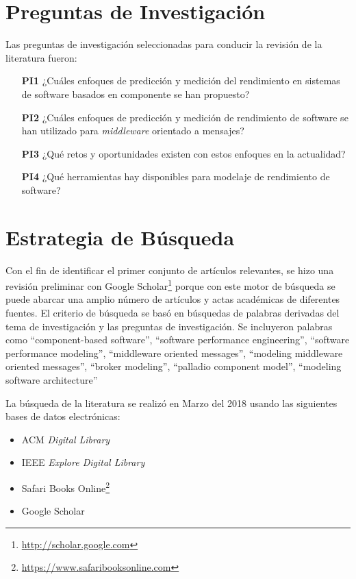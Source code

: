\documentclass[11pt, twoside]{report}
\begin{document}
\section{Preguntas de Investigación}
Las preguntas de investigación seleccionadas para conducir la revisión de la literatura fueron:
\begin{enumerate}
    \item[\textbf{PI1}] ¿Cuáles enfoques de predicción y medición del rendimiento en sistemas de software basados en componente se han propuesto?
    \item[\textbf{PI2}] ¿Cuáles enfoques de predicción y medición de rendimiento de software se han utilizado para \emph{middleware} orientado a mensajes?    
    \item[\textbf{PI3}] ¿Qué retos y oportunidades existen con estos enfoques en la actualidad?
    \item[\textbf{PI4}] ¿Qué herramientas hay disponibles para modelaje de rendimiento de software?
\end{enumerate}

\section{Estrategia de Búsqueda}
Con el fin de identificar el primer conjunto de artículos relevantes, se hizo una revisión preliminar con Google Scholar\footnote{\url{http://scholar.google.com}} porque con este motor de búsqueda se puede abarcar una amplio número de artículos y actas académicas de diferentes fuentes. El criterio de búsqueda se basó en búsquedas de palabras derivadas del tema de investigación y las preguntas de investigación. Se incluyeron palabras como ``component-based software'', ``software performance engineering'', ``software performance modeling'', ``middleware oriented messages'', ``modeling middleware oriented messages'', ``broker modeling'', ``palladio component model'', ``modeling software architecture''

La búsqueda de la literatura se realizó en Marzo del 2018 usando las siguientes bases de datos electrónicas:
\begin{itemize}
    \item ACM \emph{Digital Library} 
    \item IEEE \emph{Explore Digital Library}
    \item Safari Books Online\footnote{\url{https://www.safaribooksonline.com}}
    \item Google Scholar
\end{itemize}
\end{document}
